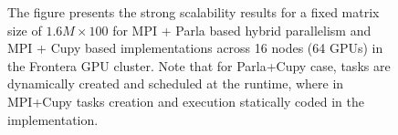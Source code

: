 \documentclass{article}
\begin{document}
\begin{figure}[H]
    \caption{The figure presents the strong scalability results for a fixed matrix size of $1.6M \times 100$ for MPI + Parla based hybrid parallelism and MPI + Cupy based implementations across 16 nodes (64 GPUs) in the Frontera GPU cluster. Note that for Parla+Cupy case, tasks are dynamically created and scheduled at the runtime, where in MPI+Cupy tasks creation and execution statically coded in the implementation. \label{fig:parla_ss_n100}
    }
\end{figure}
\end{document}
